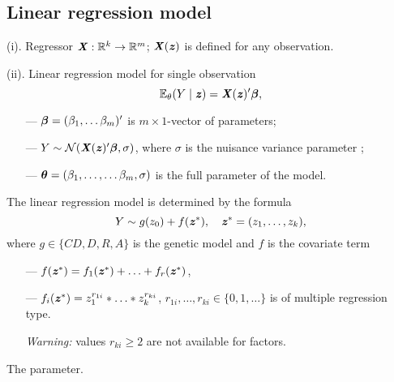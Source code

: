 \documentclass[11pt]{article}
\begin{document}
\subsection*{Linear regression model} 

\noindent(i). Regressor $\mbox{\textbf{\textit X}}:{\mathbb R}^k\to{\mathbb R}^m$; $\mbox{\textbf{\textit X}}(\mbox{\textbf{\textit z}})$ is defined for any observation.

\noindent(ii). Linear regression model for single observation 
$$
\E_{\theta}(Y\mid\zbi)=\Xbi(\zbi)'\betab,
\vspace{-3mm}
$$
\begin{itemize}
\setlength\itemsep{-0.3em}
\item[---]
${\boldsymbol \beta}=(\beta_1,\ldots\beta_m)'$ is $m\times 1$-vector of parameters;
\item[---]
$Y\sim {\cal N}(\mbox{\textbf{\textit X}}(\mbox{\textbf{\textit z}})'{\boldsymbol \beta},\sigma)$, where $\sigma$ is the nuisance variance parameter ;
\item[---]
${\boldsymbol \theta}=(\beta_1,\ldots,\ldots\beta_m,\sigma)$ is the full parameter of the model.
\end{itemize}
The linear regression model is determined by the formula 
$$
Y\sim g(z_0)+f(\zbi^*),\quad \zbi^*=(z_1,\ldots,z_k),
\vspace{-2mm}
$$
where $g\in \{CD,D,R,A\}$ is the genetic model and $f$ is the covariate term
\vspace{-2mm}
\begin{itemize}
\setlength\itemsep{-0.3em}
\item[---]
$f(\mbox{\textbf{\textit z}}^*)=f_1(\mbox{\textbf{\textit z}}^*)+\ldots+f_r(\mbox{\textbf{\textit z}}^*)$, 
\item[---]
$f_i(\mbox{\textbf{\textit z}}^*)=z_1^{r_{1i}}*\ldots*z_k^{r_{ki}}$, $r_{1i},\ldots,r_{ki}\in\{0,1,\ldots\}$ is of multiple regression type.
\item[]
\textit{Warning:} values $r_{ki}\geq 2$ are not available for factors.
\end{itemize}
The parameter.\vspace{-2mm}
\end{document}
